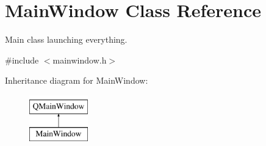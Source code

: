 \hypertarget{classMainWindow}{}\section{Main\+Window Class Reference}
\label{classMainWindow}


Main class launching everything.  




{\ttfamily \#include $<$mainwindow.\+h$>$}

Inheritance diagram for Main\+Window\+:\begin{figure}[H]
\begin{center}
\leavevmode
\includegraphics[height=2.000000cm]{classMainWindow}
\end{center}
\end{figure}
